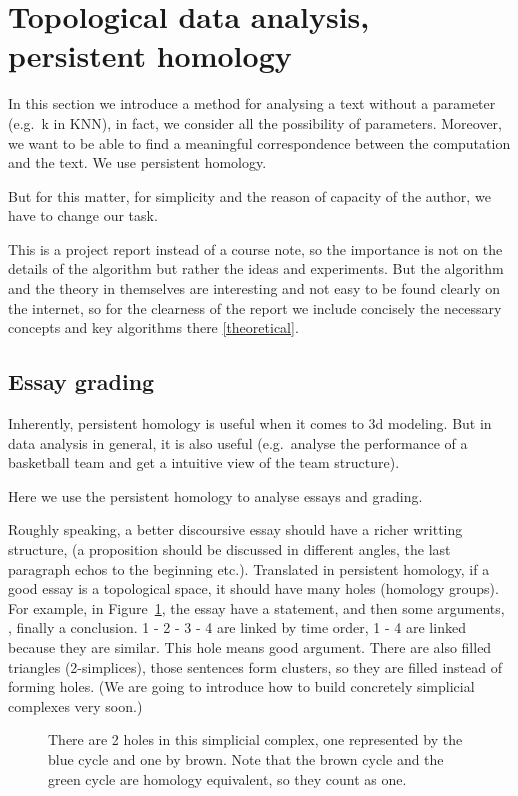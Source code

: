 \section{Topological data analysis, persistent homology}

In this section we introduce a method for analysing a text
without a parameter (e.g.\ k in KNN), in fact, we consider all
the possibility of parameters. Moreover, we want to be able to
find a meaningful correspondence between the computation and
the text. We use persistent homology.

But for this matter, for simplicity and the reason of capacity
of the author, we have to change our task.

This is a project report instead of a course note, so the importance
is not on the details of the algorithm but rather the ideas and experiments.
But the algorithm and the theory in themselves are interesting and not
easy to be found clearly on the internet, so for the clearness of the report
we include concisely the necessary
concepts and key algorithms there \ref{theoretical}.

\subsection{Essay grading}

Inherently, persistent homology is useful when it comes to 3d modeling.
But in data analysis in general, it is also useful (e.g.\ analyse the
performance of a basketball team and get a intuitive view of the team structure).

Here we use the persistent homology to analyse essays and grading.

Roughly speaking, a better discoursive essay should have a
richer writting structure, (a proposition should be discussed
in different angles, the last paragraph echos to the beginning etc.).
Translated in persistent homology,
if a good essay is a topological space, it should have
many holes (homology groups). For example,
in Figure~\ref{apple}, the essay have a statement, and then some arguments,
, finally a conclusion. 1 - 2 - 3 - 4 are linked by time order, 1 - 4 are linked because they are similar.
This hole means good argument. There are also filled triangles (2-simplices), those
sentences form clusters, so they are filled instead of forming holes.
(We are going to introduce how to build concretely simplicial complexes very soon.)

\begin{figure}[H]
  \centering
  
  \caption{There are 2 holes in this simplicial complex,
  one represented by the blue cycle and one by brown.
  Note that the brown cycle and the green cycle are homology equivalent, so they count as one.}
  \label{apple}
\end{figure}

